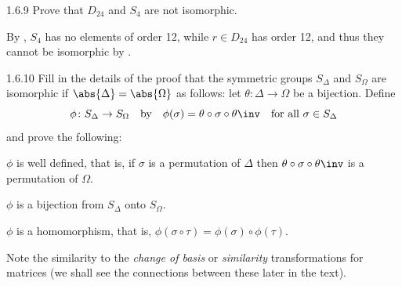\begin{exercise}{1.6.9}
    Prove that $D_{24}$ and $S_4$ are not isomorphic.
\end{exercise}

\begin{sol}
    By , $S_4$ has no elements of order 12, while $r \in D_{24}$ has order 12, and thus they cannot be isomorphic by .
\end{sol}

\begin{exercise}{1.6.10}
    Fill in the details of the proof that the symmetric groups $S_\Delta$ and $S_\Omega$ are isomorphic if $\abs{\Delta} = \abs{\Omega}$ as follows: let $\theta \colon \Delta \to \Omega$ be a bijection.
	Define
    \[
        \phi \colon S_\Delta \to S_\Omega \quad \text{by} \quad \phi(\sigma) = \theta \circ \sigma \circ \theta\inv \quad \text{for all } \sigma \in S_\Delta
    \]
    and prove the following:
    \begin{subexercises}
        \item $\phi$ is well defined, that is, if $\sigma$ is a permutation of $\Delta$ then $\theta \circ \sigma \circ \theta\inv$ is a permutation of $\Omega$.
        \item $\phi$ is a bijection from $S_\Delta$ onto $S_\Omega$.
        \item $\phi$ is a homomorphism, that is, $\phi(\sigma \circ \tau) = \phi(\sigma) \circ \phi(\tau)$.
    \end{subexercises}
    Note the similarity to the \emph{change of basis} or \emph{similarity} transformations for matrices (we shall see the connections between these later in the text).
\end{exercise}


